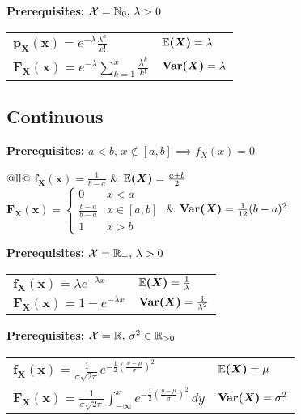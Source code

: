 \begin{ddefinition*}
  \textbf{Prerequisites:} \(\operatorname{\mathcal{X}} = \mathbb{N}_0, \, \lambda > 0\) \\
  \begin{tabularx}{\linewidth}{@{}ll@{}}
    \(\bm{p_X(x)} = e^{-\lambda}\frac{\lambda^x}{x!}\) & \(\bm{\mathbb{E}(X)} = \lambda\) \\
    \(\bm{F_X(x)} = e^{-\lambda} \sum\limits_{k=1}^x \frac{\lambda^k}{k!}\) & \(\bm{\Var(X)} = \lambda\)
  \end{tabularx}
\end{ddefinition*}

\pagebreak
\subsection*{Continuous}
\begin{cdefinition*}
  \textbf{Prerequisites:} \(a < b, \, x \notin [a, b] \implies f_X(x) = 0\) \\
  \begin{tabularx}{\linewidth}{@{}ll@{}}
    \(\bm{f_X(x)} = \frac{1}{b-a}\) & \(\bm{\mathbb{E}(X)} = \frac{a + b}{2}\) \\
    \(\bm{F_X(x)} = \begin{cases}0 & x < a \\ \frac{t - a}{b - a} & x \in [a, b] \\ 1 & x > b\end{cases}\) & \(\bm{\Var(X)} = \frac{1}{12}(b - a)^2\)
  \end{tabularx}
\end{cdefinition*}

\begin{cdefinition*}
  \textbf{Prerequisites:} \(\operatorname{\mathcal{X}} = \mathbb{R}_+, \, \lambda > 0\) \\
  \begin{tabularx}{\linewidth}{@{}ll@{}}
    \(\bm{f_X(x)} = \lambda e^{-\lambda x}\) & \(\bm{\mathbb{E}(X)} = \frac{1}{\lambda}\) \\
    \(\bm{F_X(x)} = 1 - e^{-\lambda x}\) & \(\bm{\Var(X)} = \frac{1}{\lambda^2}\)
  \end{tabularx}
\end{cdefinition*}

\begin{cdefinition*}
  \textbf{Prerequisites:} \(\operatorname{\mathcal{X}} = \mathbb{R}, \, \sigma^2 \in \mathbb{R}_{>0}\) \\
  \begin{tabularx}{\linewidth}{@{}ll@{}}
    \(\bm{f_X(x)} = \frac{1}{\sigma\sqrt{2 \pi}}e^{-\frac{1}{2}\left(\frac{x - \mu}{\sigma}\right)^2}\) & \(\bm{\mathbb{E}(X)} = \mu\) \\
    \(\bm{F_X(x)} = \frac{1}{\sigma\sqrt{2 \pi}}\int_{-\infty}^xe^{-\frac{1}{2}\left(\frac{y - \mu}{\sigma}\right)^2} \, dy\) & \(\bm{\Var(X)} = \sigma^2\)
  \end{tabularx}
\end{cdefinition*}

